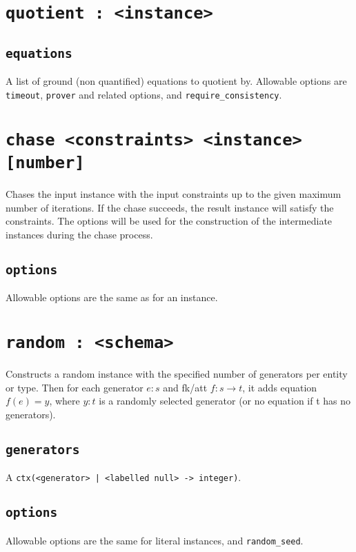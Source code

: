 \documentclass[10pt]{book}
\begin{document}
\section{{\tt quotient : <instance>}}

\subsection{{\tt equations}}
A list of ground (non quantified) equations to quotient by.  Allowable options are {\tt timeout}, {\tt prover} and related options, and {\tt require\_consistency}.

\section{{\tt chase <constraints> <instance> [number]}}

Chases the input instance with the input constraints up to the given maximum number of iterations.  If the chase succeeds, the result instance will satisfy the constraints.  The options will be used for the construction of the intermediate instances during the chase process.

\subsection{{\tt options}}
Allowable options are the same as for an instance.


\section{{\tt random : <schema>}}

Constructs a random instance with the specified number of generators per entity or type. Then for each generator $e:s$ and fk/att $f : s \to t$, it adds equation $f(e) = y$, where $y:t$ is a randomly selected generator (or no equation if t has no generators).

\subsection{{\tt generators}}
A {\tt ctx(<generator> | <labelled null> -> integer)}.

\subsection{{\tt options}}
Allowable options are the same for literal instances, and {\tt random\_seed}.
\end{document}
